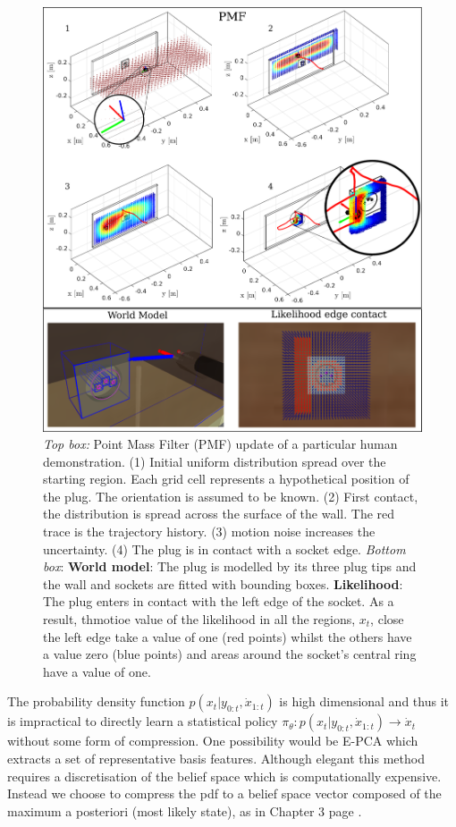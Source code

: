 \begin{figure}
 \centering
   \includegraphics[width=\textwidth]{./ch4-PiH/Figures/PMF/pmf_likelihood_v2.pdf}
   \caption{\textit{Top box:} Point Mass Filter (PMF) update of a particular human demonstration. (1) Initial uniform distribution spread over the starting 
   region. Each grid cell represents a hypothetical position of the plug. The orientation is assumed to be known. (2) First contact, the distribution 
   is spread across the surface of the wall. The red trace is the trajectory history. (3) motion noise increases the uncertainty. (4) The plug is in contact with a socket edge.
   \textit{Bottom box}: \textbf{World model}: The plug is modelled by its three plug tips and the wall and sockets are fitted with bounding boxes.
    \textbf{Likelihood}: The plug enters in contact with the left edge of the socket. As a result, thmotioe value of the likelihood in all the regions, $x_t$, close the left edge take 
   a value of one (red points)  whilst the others have a value zero (blue points) and areas around the socket's central 
   ring have a value of one. }
  \label{fig:PMF}
\end{figure}

The probability density function $p(x_t|y_{0:t},\dot{x}_{1:t})$ is high dimensional and thus it is 
impractical to directly learn a statistical policy $\pi_{\theta} : p(x_t|y_{0:t},\dot{x}_{1:t}) \rightarrow \dot{x}_t$
without some form of compression. One possibility would be E-PCA \citep{EPCA_2003} which extracts a set of 
representative basis features. Although elegant this method 
requires a discretisation of the belief space which is computationally expensive. Instead we choose to 
compress the pdf to a belief space vector composed of the maximum a posteriori (most likely state), as in Chapter 3 page \pageref{ch3:formulation}. 

